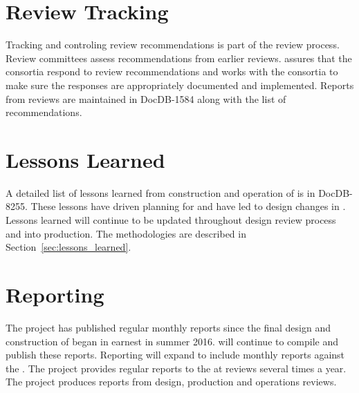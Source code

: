 \section{Review Tracking}

Tracking and controling review recommendations is part of the review
process. Review committees assess recommendations from earlier
reviews.  assures that the consortia respond to review
recommendations and works with the consortia to make sure the
responses are appropriately documented and implemented. Reports from
 reviews are maintained in DocDB-1584 along with the list
of recommendations.


\section{Lessons Learned}
\label{sec:fdsp-coord-lessons}

A detailed list of lessons learned from construction and operation of
 is in DocDB-8255. These lessons have driven planning for
 and have led to design changes in . Lessons
learned will continue to be updated throughout design review process
and into production. The methodologies are described in
Section~\ref{sec:lessons_learned}.


\section{Reporting}
\label{sec:fdsp-coord-reporting}

The  project has published regular monthly reports since
the final design and construction of  began in
earnest in summer 2016.  will continue to compile and
publish these reports. Reporting will expand to include monthly
reports against the . The  project provides
regular reports to the  at reviews several times a
year. The  project produces reports from design,
production and operations reviews.
